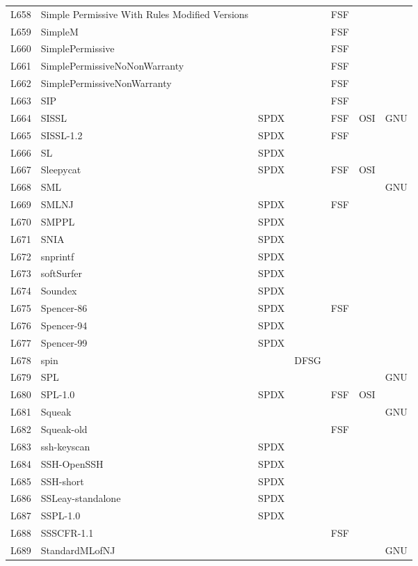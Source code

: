 \begin{longtable}[h]{m{2cm} | m{7cm} | c | c | c | c | c}
  L658 & Simple Permissive With Rules Modified Versions &  &  & FSF &  &  \\
  L659 & SimpleM &  &  & FSF &  &  \\
  L660 & SimplePermissive &  &  & FSF &  &  \\
  L661 & SimplePermissiveNoNonWarranty &  &  & FSF &  &  \\
  L662 & SimplePermissiveNonWarranty &  &  & FSF &  &  \\
  L663 & SIP &  &  & FSF &  &  \\
  L664 & SISSL & SPDX &  & FSF & OSI & GNU \\
  L665 & SISSL-1.2 & SPDX &  & FSF &  &  \\
  L666 & SL & SPDX &  &  &  &  \\
  L667 & Sleepycat & SPDX &  & FSF & OSI &  \\
  L668 & SML &  &  &  &  & GNU \\
  L669 & SMLNJ & SPDX &  & FSF &  &  \\
  L670 & SMPPL & SPDX &  &  &  &  \\
  L671 & SNIA & SPDX &  &  &  &  \\
  L672 & snprintf & SPDX &  &  &  &  \\
  L673 & softSurfer & SPDX &  &  &  &  \\
  L674 & Soundex & SPDX &  &  &  &  \\
  L675 & Spencer-86 & SPDX &  & FSF &  &  \\
  L676 & Spencer-94 & SPDX &  &  &  &  \\
  L677 & Spencer-99 & SPDX &  &  &  &  \\
  L678 & spin &  & DFSG &  &  &  \\
  L679 & SPL &  &  &  &  & GNU \\
  L680 & SPL-1.0 & SPDX &  & FSF & OSI &  \\
  L681 & Squeak &  &  &  &  & GNU \\
  L682 & Squeak-old &  &  & FSF &  &  \\
  L683 & ssh-keyscan & SPDX &  &  &  &  \\
  L684 & SSH-OpenSSH & SPDX &  &  &  &  \\
  L685 & SSH-short & SPDX &  &  &  &  \\
  L686 & SSLeay-standalone & SPDX &  &  &  &  \\
  L687 & SSPL-1.0 & SPDX &  &  &  &  \\
  L688 & SSSCFR-1.1 &  &  & FSF &  &  \\
  L689 & StandardMLofNJ &  &  &  &  & GNU \\

\end{longtable}
